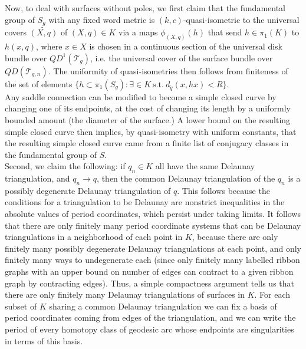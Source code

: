 \documentclass[12pt]{article}
\begin{document}
\noindent Now, to deal with surfaces without poles, we first claim that the fundamental group of $S_g$ with any fixed word metric is $(k,c)$-quasi-isometric to the universal covers $\tilde{(X,q)}$ of $(X,q) \in K$ via a maps $\phi_(X,q)(h)$ that send $h \in \pi_1(K)$ to $h(x,q)$, where $x \in X$ is chosen in a continuous section of the universal disk bundle over $QD^1(\mathcal{T}_g)$, i.e. the universal cover of the surface bundle over $QD(\mathcal{T}_{g,n})$. The uniformity of quasi-isometries then follows from finiteness of the set of elements $\{h \subset \pi_1(S_g): \exists \in K ~\mathrm{s.t.}~ d_{\tilde{q}}(x,hx) < R\}$.\\

\noindent Any saddle connection can be modified to become a simple closed curve by changing one of its endpoints, at the cost of changing its length by a uniformly bounded amount (the diameter of the surface.) A lower bound on the resulting simple closed curve then implies, by quasi-isometry with uniform constants, that the resulting simple closed curve came from a finite list of conjugacy classes in the fundamental group of $S$.\\

\noindent Second, we claim the following: if $q_n \in K$ all have the same Delaunay triangulation, and $q_n \to q$, then the common Delaunay triangulation of the $q_n$ is a possibly degenerate Delaunay triangulation of $q$. This follows because the conditions for a triangulation to be Delaunay are nonstrict inequalities in the absolute values of period coordinates, which persist under taking limits. It follows that there are only finitely many period coordinate systems that can be Delaunay triangulations in a neighborhood of each point in $K$, because there are only finitely many possibly degenerate Delaunay triangulations at each point, and only finitely many ways to undegenerate each (since only finitely many labelled ribbon graphs with an upper bound on number of edges can contract to a given ribbon graph by contracting edges). Thus, a simple compactness argument tells us that there are only finitely many Delaunay triangulations of surfaces in $K$. For each subset of $K$ sharing a common Delaunay triangulation we can fix a basis of period coordinates coming from edges of the triangulation, and we can write the period of every homotopy class of geodesic arc whose endpoints are singularities in terms of this basis.\\
\end{document}
